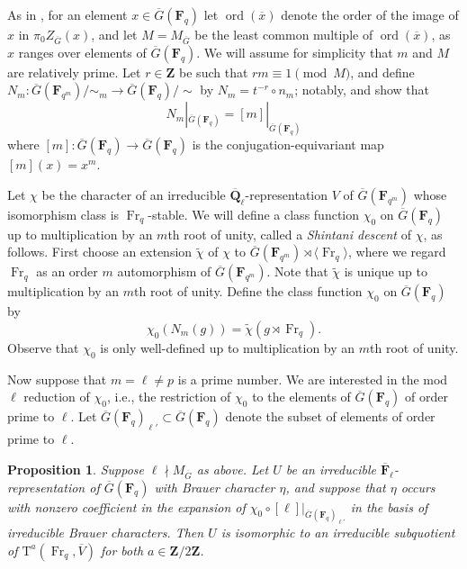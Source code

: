\documentclass[reqno]{amsart}
\numberwithin{equation}{subsection}
\newcommand{\F}{\mathbf{F}}
\newcommand{\wt}[1]{\widetilde{#1}}
\newcommand{\Q}{\mathbf{Q}}
\newcommand{\Z}{\mathbf{Z}}
\newcommand{\ol}[1]{\overline{#1}}
\newcommand{\co}{\colon}
\DeclareMathOperator{\ord}{ord}
\DeclareMathOperator{\Fr}{Fr}
\newcommand{\rT}{\ensuremath{\mathrm{T}}\xspace}
\newtheorem{prop}[thm]{Proposition}
\theoremstyle{remark}
\numberwithin{equation}{subsection}
\numberwithin{figure}{subsection}
\begin{document}
As in \cite[1.2]{Kaw87}, for an element $x \in \ol G(\F_q)$ let $\ord(\ol x)$ denote the order of the image of $x$ in $\pi_0Z_{\ol G}(x)$, and let $M = M_{\ol G}$ be the least common multiple of $\ord(\ol x)$, as $x$ ranges over elements of $\ol G(\F_q)$. We will assume for simplicity that $m$ and $M$ are relatively prime. Let $r \in \Z$ be such that $rm \equiv 1 \pmod{M}$, and define $N_m\co \ol G(\F_{q^m})/\sim_m \to \ol G(\F_q)/\sim$ by $N_m = t^{-r} \circ n_m$; notably, \cite[(1.2.6)]{Kaw87} and \cite[Proposition 3.11]{Dig86b} show that
\begin{equation}\label{eqn:restriction-of-shintani-power}
N_m|_{\ol G(\F_q)} = [m]|_{\ol G(\F_q)}
\end{equation}
where $[m]\co \ol G(\F_q) \to \ol G(\F_q)$ is the conjugation-equivariant map $[m](x) = x^m$.

Let $\chi$ be the character of an irreducible $\ol\Q_\ell$-representation $V$ of $\ol G(\F_{q^m})$ whose isomorphism class is $\Fr_q$-stable. We will define a class function $\chi_0$ on $\ol G(\F_q)$ up to multiplication by an $m$th root of unity, called a \textit{Shintani descent} of $\chi$, as follows. First choose an extension $\widetilde\chi$ of $\chi$ to $\ol G(\F_{q^m}) \rtimes \langle\Fr_q\rangle$, where we regard $\Fr_q$ as an order $m$ automorphism of $\ol G(\F_{q^m})$. Note that $\wt\chi$ is unique up to multiplication by an $m$th root of unity. Define the class function $\chi_0$ on $\ol G(\F_q)$ by
\begin{equation}\label{eqn:shintani-descent-relation}
\chi_0(N_m(g)) = \widetilde{\chi}(g \rtimes \Fr_q).
\end{equation}
Observe that $\chi_0$ is only well-defined up to multiplication by an $m$th root of unity.

Now suppose that $m = \ell \neq p$ is a prime number. We are interested in the mod $\ell$ reduction of $\chi_0$, i.e., the restriction of $\chi_0$ to the elements of $\ol G(\F_q)$ of order prime to $\ell$. Let $\ol G(\F_q)_{\ell'} \subset \ol G(\F_q)$ denote the subset of elements of order prime to $\ell$.

\begin{prop}\label{prop:tate-cohomology-shintani-descent}
    Suppose $\ell \nmid M_{\ol G}$ as above. Let $U$ be an irreducible $\ol\F_\ell$-representation of $\ol G(\F_q)$ with Brauer character $\eta$, and suppose that $\eta$ occurs with nonzero coefficient in the expansion of $\chi_0 \circ [\ell]|_{\ol G(\F_q)_{\ell'}}$ in the basis of irreducible Brauer characters. Then $U$ is isomorphic to an irreducible subquotient of $\rT^a(\Fr_q, \ol V)$ for both $a \in \Z/2\Z$.
\end{prop}
\end{document}
